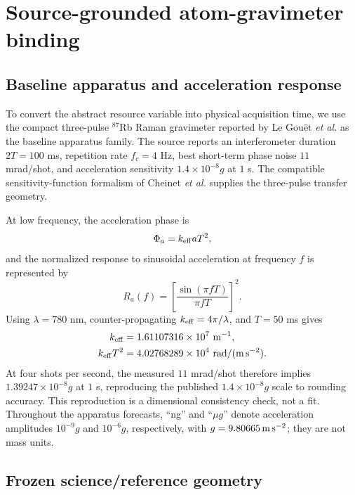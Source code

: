 \section{Source-grounded atom-gravimeter binding}
\label{sec:apparatus}

\subsection{Baseline apparatus and acceleration response}

To convert the abstract resource variable into physical acquisition time, we use the compact three-pulse $^{87}$Rb Raman gravimeter reported by Le Gou\"et \emph{et al.} \cite{LeGouet2008} as the baseline apparatus family. The source reports an interferometer duration $2T=100$ ms, repetition rate $f_c=4$ Hz, best short-term phase noise $11$ mrad/shot, and acceleration sensitivity $1.4\times10^{-8}g$ at $1$ s. The compatible sensitivity-function formalism of Cheinet \emph{et al.} \cite{Cheinet2008} supplies the three-pulse transfer geometry.

At low frequency, the acceleration phase is
\begin{equation}
\Phi_a=k_{\rm eff}aT^2,
\label{eq:ai-scale}
\end{equation}
and the normalized response to sinusoidal acceleration at frequency $f$ is represented by
\begin{equation}
R_a(f)=\left[\frac{\sin(\pi fT)}{\pi fT}\right]^2.
\label{eq:ra}
\end{equation}
Using $\lambda=780$ nm, counter-propagating $k_{\rm eff}=4\pi/\lambda$, and $T=50$ ms gives
\begin{align}
k_{\rm eff}&=1.61107316\times10^7\ {\rm m}^{-1},\\
k_{\rm eff}T^2&=4.02768289\times10^4\ {\rm rad/(m\,s^{-2})}.
\end{align}
At four shots per second, the measured $11$ mrad/shot therefore implies $1.39247\times10^{-8}g$ at $1$ s, reproducing the published $1.4\times10^{-8}g$ scale to rounding accuracy. This reproduction is a dimensional consistency check, not a fit. Throughout the apparatus forecasts, ``ng'' and ``$\mu g$'' denote acceleration amplitudes $10^{-9}g$ and $10^{-6}g$, respectively, with $g=9.80665\,{\rm m\,s^{-2}}$; they are not mass units.

\subsection{Frozen science/reference geometry}

